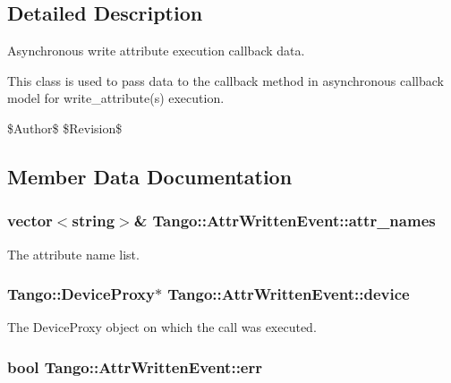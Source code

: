 \subsection{Detailed Description}
Asynchronous write attribute execution callback data. 

This class is used to pass data to the callback method in asynchronous callback model for write\-\_\-attribute(s) execution.

\$\-Author\$ \$\-Revision\$ 

\subsection{Member Data Documentation}
\subsubsection[{attr\-\_\-names}]{\setlength{\rightskip}{0pt plus 5cm}vector$<$string$>$\& Tango\-::\-Attr\-Written\-Event\-::attr\-\_\-names}\label{classTango_1_1AttrWrittenEvent_a5ffa7a0ee56495141515b939d64df365}


The attribute name list. 

\subsubsection[{device}]{\setlength{\rightskip}{0pt plus 5cm}Tango\-::\-Device\-Proxy$\ast$ Tango\-::\-Attr\-Written\-Event\-::device}\label{classTango_1_1AttrWrittenEvent_a23c2655b23415d44475c2ecfe5eeb782}


The Device\-Proxy object on which the call was executed. 

\subsubsection[{err}]{\setlength{\rightskip}{0pt plus 5cm}bool Tango\-::\-Attr\-Written\-Event\-::err}\label{classTango_1_1AttrWrittenEvent_ac81796b8acd485a713c00695bf53d5a8}



